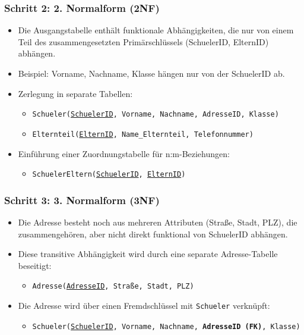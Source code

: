 \documentclass[a4paper,12pt]{article}
\begin{document}
\begin{enumerate}
	\vspace{0.5em}
	
	\subsubsection*{Schritt 2: 2. Normalform (2NF)}
	\begin{itemize}
		\item Die Ausgangstabelle enthält funktionale Abhängigkeiten, die nur von einem Teil des zusammengesetzten Primärschlüssels (SchuelerID, ElternID) abhängen.
		\item Beispiel: Vorname, Nachname, Klasse hängen nur von der SchuelerID ab.
		\item Zerlegung in separate Tabellen:
		\begin{itemize}
			\item \texttt{Schueler(\underline{SchuelerID}, Vorname, Nachname, AdresseID, Klasse)}
			\item \texttt{Elternteil(\underline{ElternID}, Name\_Elternteil, Telefonnummer)}
		\end{itemize}
		\item Einführung einer Zuordnungstabelle für n:m-Beziehungen:
		\begin{itemize}
			\item \texttt{SchuelerEltern(\underline{SchuelerID}, \underline{ElternID})}
		\end{itemize}
	\end{itemize}
	
	\vspace{0.5em}
	
	\subsubsection*{Schritt 3: 3. Normalform (3NF)}
	\begin{itemize}
		\item Die Adresse besteht noch aus mehreren Attributen (Straße, Stadt, PLZ), die zusammengehören, aber nicht direkt funktional von SchuelerID abhängen.
		\item Diese transitive Abhängigkeit wird durch eine separate Adresse-Tabelle beseitigt:
		\begin{itemize}
			\item \texttt{Adresse(\underline{AdresseID}, Straße, Stadt, PLZ)}
		\end{itemize}
		\item Die Adresse wird über einen Fremdschlüssel mit \texttt{Schueler} verknüpft:
		\begin{itemize}
			\item \texttt{Schueler(\underline{SchuelerID}, Vorname, Nachname, \textbf{AdresseID (FK)}, Klasse)}
		\end{itemize}
	\end{itemize}
	

\end{enumerate}
\end{document}
